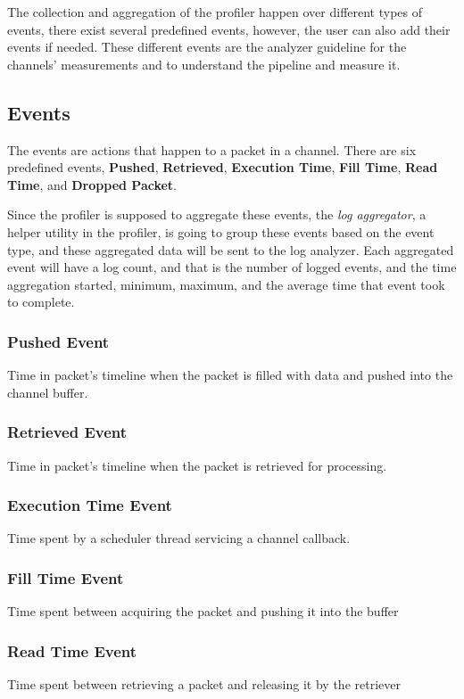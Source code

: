 The collection and aggregation of the profiler happen over different types of  events, there exist several
predefined events, however, the user can also add their events if needed. These different events are
the analyzer guideline for the channels' measurements and to understand the pipeline and measure it.

\subsection{Events}\label{sec:events}
The events are actions that happen to a packet in a channel. There are six predefined events, \textbf{Pushed},
\textbf{Retrieved}, \textbf{Execution Time}, \textbf{Fill Time}, \textbf{Read Time}, and \textbf{Dropped Packet}.

Since the profiler is supposed to aggregate these events, the \textit{log aggregator}, a helper utility in the profiler, is going to group these events
based on the event type, and these aggregated data will be sent to the log analyzer. Each aggregated event will have
a log count, and that is the number of logged events, and the time aggregation started, minimum,
maximum, and the average time that event took to complete.

\subsubsection{Pushed Event}\label{sec:pushed_event}
Time in packet's timeline when the packet is filled with data and pushed into the channel buffer.

\subsubsection{Retrieved Event}\label{sec:retrieved_event}
Time in packet's timeline when the packet is retrieved for processing.

\subsubsection{Execution Time Event}
Time spent by a scheduler thread servicing a channel callback.

\subsubsection{Fill Time Event}
Time spent between acquiring the packet and pushing it into the buffer

\subsubsection{Read Time Event}\label{sec:read_time_event}
Time spent between retrieving a packet and releasing it by the retriever

